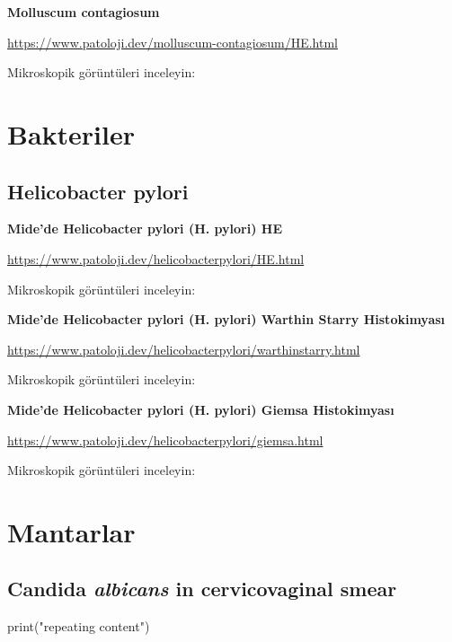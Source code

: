 \documentclass[
  letterpaper,
  DIV=11,
  numbers=noendperiod]{scrreprt}
\newenvironment{Shaded}{}{}
\newcommand{\FunctionTok}[1]{\textcolor[rgb]{0.02,0.16,0.49}{#1}}
\newcommand{\NormalTok}[1]{#1}
\newcommand{\StringTok}[1]{\textcolor[rgb]{0.25,0.44,0.63}{#1}}
\begin{document}
\textbf{Molluscum contagiosum}

\url{https://www.patoloji.dev/molluscum-contagiosum/HE.html}

Mikroskopik görüntüleri inceleyin:

\hypertarget{bakteriler}{%
\chapter{Bakteriler}\label{bakteriler}}

\hypertarget{helicobacter-pylori}{%
\section{Helicobacter pylori}\label{helicobacter-pylori}}

\textbf{Mide'de Helicobacter pylori (H. pylori) HE}

\url{https://www.patoloji.dev/helicobacterpylori/HE.html}

Mikroskopik görüntüleri inceleyin:

\textbf{Mide'de Helicobacter pylori (H. pylori) Warthin Starry
Histokimyası}

\url{https://www.patoloji.dev/helicobacterpylori/warthinstarry.html}

Mikroskopik görüntüleri inceleyin:

\textbf{Mide'de Helicobacter pylori (H. pylori) Giemsa Histokimyası}

\url{https://www.patoloji.dev/helicobacterpylori/giemsa.html}

Mikroskopik görüntüleri inceleyin:

\hypertarget{mantarlar}{%
\chapter{Mantarlar}\label{mantarlar}}

\hypertarget{candida-albicans-in-cervicovaginal-smear}{%
\section{\texorpdfstring{Candida \emph{albicans} in cervicovaginal
smear}{Candida albicans in cervicovaginal smear}}\label{candida-albicans-in-cervicovaginal-smear}}

\begin{Shaded}
\begin{Highlighting}[]
\FunctionTok{print}\NormalTok{(}\StringTok{"repeating content"}\NormalTok{)}
\end{Highlighting}
\end{Shaded}
\end{document}
